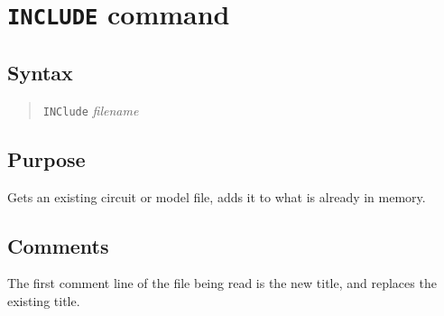 %
%
%
%
\section{{\tt INCLUDE} command}
\subsection{Syntax}
\begin{verse}
{\tt INClude} {\it filename}
\end{verse}
\subsection{Purpose}

Gets an existing circuit or model file, adds it to what is already in memory.
\subsection{Comments}

The first comment line of the file being read is the new title, and replaces
the existing title.

